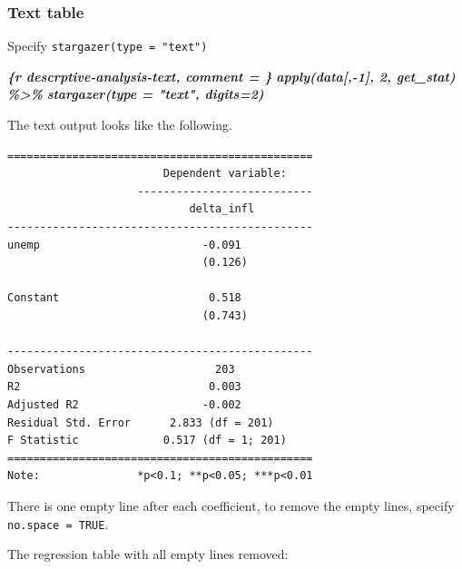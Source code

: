 \documentclass[
  a4paper,
  twoside,
  openright]{book}
\newenvironment{Shaded}{\begin{snugshade}}{\end{snugshade}}
\newcommand{\InformationTok}[1]{\textcolor[rgb]{0.56,0.35,0.01}{\textbf{\textit{#1}}}}
\theoremstyle{definition}
\theoremstyle{definition}
\theoremstyle{definition}
\theoremstyle{definition}
\theoremstyle{remark}
\begin{document}
\subsubsection*{Text table}\label{text-table}

Specify \texttt{stargazer(type\ =\ "text")}

\begin{Shaded}
\begin{Highlighting}[]
\InformationTok{\textasciigrave{}\textasciigrave{}\textasciigrave{}\{r descrptive{-}analysis{-}text, comment = \textquotesingle{}\textquotesingle{}\}}
\InformationTok{apply(data[,{-}1], 2, get\_stat) \%\textgreater{}\% }
\InformationTok{    stargazer(type = "text", digits=2)}
\InformationTok{\textasciigrave{}\textasciigrave{}\textasciigrave{}}
\end{Highlighting}
\end{Shaded}

The text output looks like the following.

\begin{verbatim}
===============================================
                        Dependent variable:    
                    ---------------------------
                            delta_infl         
-----------------------------------------------
unemp                         -0.091           
                              (0.126)          
                                               
Constant                       0.518           
                              (0.743)          
                                               
-----------------------------------------------
Observations                    203            
R2                             0.003           
Adjusted R2                   -0.002           
Residual Std. Error      2.833 (df = 201)      
F Statistic             0.517 (df = 1; 201)    
===============================================
Note:               *p<0.1; **p<0.05; ***p<0.01
\end{verbatim}

There is one empty line after each coefficient, to remove the empty lines, specify \texttt{no.space\ =\ TRUE}.

The regression table with all empty lines removed:
\end{document}
